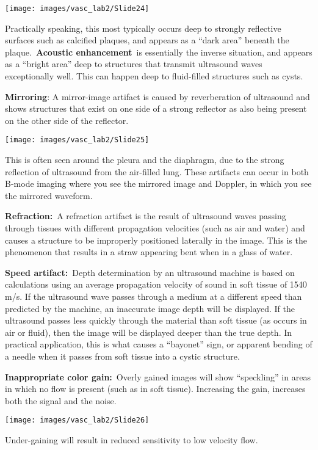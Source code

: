 \documentclass[
]{book}
\begin{document}
\texttt{[image: images/vasc\_lab2/Slide24]}

Practically speaking, this most typically occurs deep to strongly
reflective surfaces such as calcified plaques, and appears as a ``dark
area'' beneath the plaque.~\textbf{Acoustic enhancement}~is essentially the
inverse situation, and appears as a ``bright area'' deep to structures
that transmit ultrasound waves exceptionally well. This can happen deep
to fluid-filled structures such as cysts.

\textbf{Mirroring}: A mirror-image artifact is caused by reverberation of
ultrasound and shows structures that exist on one side of a strong
reflector as also being present on the other side of the reflector.

\texttt{[image: images/vasc\_lab2/Slide25]}

This is often seen around the pleura and the diaphragm, due to the
strong reflection of ultrasound from the air-filled lung. These
artifacts can occur in both B-mode imaging where you see the mirrored
image and Doppler, in which you see the mirrored waveform.

\textbf{Refraction:}~A refraction artifact is the result of ultrasound waves
passing through tissues with different propagation velocities (such as
air and water) and causes a structure to be improperly positioned
laterally in the image. This is the phenomenon that results in a straw
appearing bent when in a glass of water.

\textbf{Speed artifact:}~Depth determination by an ultrasound machine is
based on calculations using an average propagation velocity of sound in
soft tissue of 1540 m/s. If the ultrasound wave passes through a medium
at a different speed than predicted by the machine, an inaccurate image
depth will be displayed. If the ultrasound passes less quickly through
the material than soft tissue (as occurs in air or fluid), then the
image will be displayed deeper than the true depth. In practical
application, this is what causes a ``bayonet'' sign, or apparent bending
of a needle when it passes from soft tissue into a cystic structure.

\textbf{Inappropriate color gain:}~Overly gained images will show ``speckling''
in areas in which no flow is present (such as in soft tissue).
Increasing the gain, increases both the signal and the
noise.\citep{kremkau2021}

\texttt{[image: images/vasc\_lab2/Slide26]}

Under-gaining will result in reduced sensitivity to low velocity flow.
\end{document}
